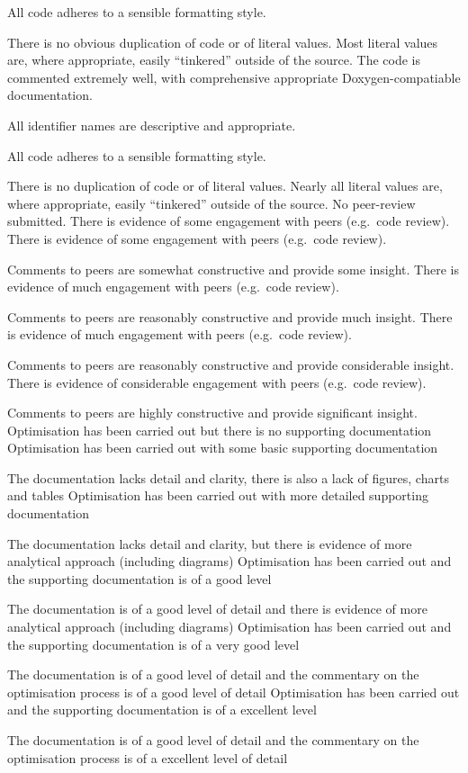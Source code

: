 \documentclass{../../fal_assignment}
\begin{document}
\begin{markingrubric}
            \par All code adheres to a sensible formatting style.
             \par There is no obvious duplication of code or of literal values. Most literal values are, where appropriate, easily ``tinkered'' outside of the source.  
        \grade The code is commented extremely well, with comprehensive appropriate Doxygen-compatiable documentation.
            \par All identifier names are descriptive and appropriate.
            \par All code adheres to a sensible formatting style.
            \par There is no duplication of code or of literal values. Nearly all literal values are, where appropriate, easily ``tinkered'' outside of the source.  
%
		\grade\fail No peer-review submitted.
		\grade There is evidence of some engagement with peers (e.g.\ code review).
		\grade There is evidence of some engagement with peers (e.g.\ code review).
		\par Comments to peers are somewhat constructive and provide some insight.
		\grade There is evidence of much engagement with peers (e.g.\ code review).
		\par Comments to peers are reasonably constructive and provide much insight.
		\grade There is evidence of much engagement with peers (e.g.\ code review).
		\par Comments to peers are reasonably constructive and provide considerable insight.
		\grade There is evidence of considerable engagement with peers (e.g.\ code review).
		\par Comments to peers are highly constructive and provide significant insight.
%
		\grade\fail Optimisation has been carried out but there is no supporting documentation
		\grade Optimisation has been carried out with some basic supporting documentation
		\par The documentation lacks detail and clarity, there is also a lack of figures, charts and tables
		\grade Optimisation has been carried out with more detailed supporting documentation
		\par The documentation lacks detail and clarity, but there is evidence of more analytical approach (including diagrams)
		\grade Optimisation has been carried out and the supporting documentation is of a good level
		\par The documentation is of a good level of detail and there is evidence of more analytical approach (including diagrams)
		\grade Optimisation has been carried out and the supporting documentation is of a very good level
		\par The documentation is of a good level of detail and the commentary on the optimisation process is of a good level of detail
		\grade Optimisation has been carried out and the supporting documentation is of a excellent level
		\par The documentation is of a good level of detail and the commentary on the optimisation process is of a excellent level of detail
\end{markingrubric}
\end{document}
